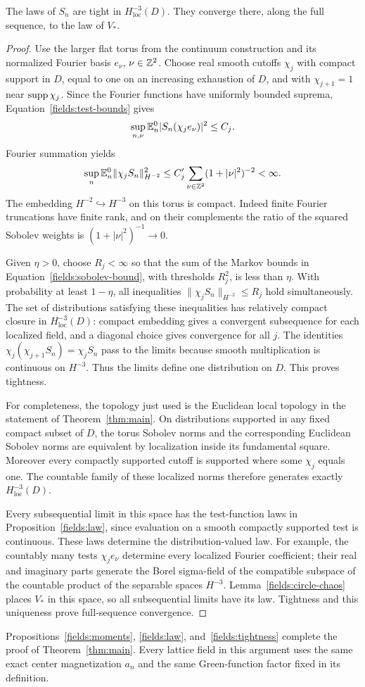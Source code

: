 \begin{proposition}
\label{fields:tightness}
The laws of $S_n$ are tight in $H^{-3}_{\mathrm{loc}}(D)$.
They converge there, along the full sequence, to the law of $V_*$.
\end{proposition}

\begin{proof}
Use the larger flat torus from the continuum construction and
its normalized Fourier basis $e_\nu$, $\nu\in\mathbb Z^2$.
Choose real smooth cutoffs $\chi_j$ with compact support in $D$,
equal to one on an increasing exhaustion of $D$, and with
$\chi_{j+1}=1$ near $\operatorname{supp}\chi_j$.
Since the Fourier functions have uniformly bounded suprema,
Equation~\eqref{fields:test-bounds} gives
\[
 \sup_{n,\nu}\mathbb E_n^0|S_n(\chi_j e_\nu)|^2\leq C_j.
\]
Fourier summation yields
\begin{equation}\label{fields:sobolev-bound}
 \sup_n\mathbb E_n^0\|\chi_j S_n\|_{H^{-2}}^2
       \leq C'_j\sum_{\nu\in\mathbb Z^2}(1+|\nu|^2)^{-2}
       <\infty.
\end{equation}
The embedding $H^{-2}\hookrightarrow H^{-3}$ on this torus
is compact.  Indeed finite Fourier truncations have finite rank,
and on their complements the ratio of the squared Sobolev
weights is $(1+|\nu|^2)^{-1}\to0$.

Given $\eta>0$, choose $R_j<\infty$ so that the sum of the
Markov bounds in Equation~\eqref{fields:sobolev-bound},
with thresholds $R_j^2$, is less than $\eta$.
With probability at least $1-\eta$, all inequalities
$\|\chi_jS_n\|_{H^{-2}}\leq R_j$ hold simultaneously.
The set of distributions satisfying these inequalities has
relatively compact closure in $H^{-3}_{\mathrm{loc}}(D)$:
compact embedding gives a convergent subsequence for each
localized field, and a diagonal choice gives convergence for
all $j$.  The identities
$\chi_j(\chi_{j+1}S_n)=\chi_jS_n$ pass to the limits because
smooth multiplication is continuous on $H^{-3}$.  Thus the
limits define one distribution on $D$.  This proves tightness.

For completeness, the topology just used is the Euclidean
local topology in the statement of Theorem~\ref{thm:main}.
On distributions supported in any fixed compact subset of $D$,
the torus Sobolev norms and the corresponding Euclidean
Sobolev norms are equivalent by localization inside its
fundamental square.  Moreover every compactly supported
cutoff is supported where some $\chi_j$ equals one.
The countable family of these localized norms therefore
generates exactly $H^{-3}_{\mathrm{loc}}(D)$.

Every subsequential limit in this space has the test-function
laws in Proposition~\ref{fields:law}, since evaluation on a
smooth compactly supported test is continuous.
These laws determine the distribution-valued law.  For
example, the countably many tests $\chi_j e_\nu$ determine
every localized Fourier coefficient; their real and imaginary
parts generate the Borel sigma-field of the compatible
subspace of the countable product of the separable spaces
$H^{-3}$.  Lemma~\ref{fields:circle-chaos} places $V_*$
in this space, so all subsequential limits have its law.
Tightness and this uniqueness prove full-sequence convergence.
\end{proof}

Propositions~\ref{fields:moments}, \ref{fields:law},
and~\ref{fields:tightness} complete the proof of
Theorem~\ref{thm:main}.  Every lattice field in this argument
uses the same exact center magnetization $a_n$ and the same
Green-function factor fixed in its definition.

